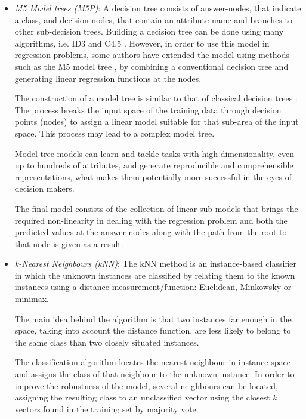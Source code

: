 \documentclass[a4paper,10pt,twocolumn,preprint,3p]{elsarticle}
\begin{document}
\begin{itemize}

 \item \emph{M5 Model trees (M5P)}: 
A decision tree consists of answer-nodes, that indicate a class, and decision-nodes, 
that contain an attribute name and branches to other sub-decision trees.
Building a decision tree can be done using many algorithms, i.e. ID3 and C4.5 \cite{Quinlan1986}.
However, in order to use this model in regression problems, some authors have 
extended the model using methods such as the M5 model tree \cite{Quinlan1986,Quinlan1992,Wang1997,WittenFrank2000}, 
by combining a conventional decision tree and generating linear regression 
functions at the nodes.

The construction of a model tree is similar to that of classical decision 
trees \cite{Solomatine2004}:
The process breaks the input space of the training data through decision points 
(nodes) to assign a linear model suitable for that sub-area of the input space. 
This process may lead to a complex model tree.

Model tree models can learn and tackle tasks with high dimensionality, even up to 
hundreds of attributes, and generate reproducible and comprehensible representations, 
what makes them potentially more successful in the eyes of decision makers.

The final model consists of the collection of linear sub-models that brings the 
required non-linearity in dealing with the regression problem
and both the predicted values at the answer-nodes along with the path from the 
root to that node is given as a result.


 \item \emph{k-Nearest Neighbours (kNN)}: 
The kNN \cite{Aha1991,Mitchell1997} method is an instance-based classifier in 
which the unknown instances are classified by relating them to the known 
instances using a distance measurement/function: Euclidean, Minkowsky or minimax.

The main idea behind the algorithm is that two instances far enough in the space, 
taking into account the distance function, are less likely to belong to the 
same class than two closely situated instances.

The classification algorithm locates the nearest neighbour in instance space and 
assigns the class of that neighbour to the unknown instance.
In order to improve the robustness of the model, several neighbours can be 
located, assigning the resulting class to an unclassified vector using the 
closest $k$ vectors found in the training set by majority vote.



\end{itemize}
\end{document}
